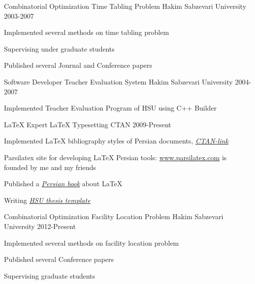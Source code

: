 \begin{cventries}
 \cventry
{Combinatorial Optimization} %
{Time Tabling Problem} %
{Hakim Sabzevari University} %
{2003-2007} %
{
	\begin{cvitems} %
		\item {Implemented several methods on time tabling problem}
		\item{Supervising under graduate students}
\item{Published several Journal and Conference papers}		
	\end{cvitems}
}

  \cventry
{Software Developer} %
{Teacher Evaluation System} %
{Hakim Sabzevari University} %
{2004-2007} %
{
	\begin{cvitems} %
		\item {Implemented Teacher Evaluation Program of HSU using C++ Builder}
	\end{cvitems}
}

  \cventry
{\LaTeX{} Expert} %
{\LaTeX{} Typesetting} %
{CTAN} %
{2009-Present} %
{
	\begin{cvitems} %
		\item {Implemented \LaTeX{} bibliography styles of Persian documents, \href{https://ctan.org/author/amintoosi?lang=en}{\textit{CTAN-link}}}
		\item{Parsilatex site for developing LaTeX Persian tools: \url{www.parsilatex.com} is founded by me and my friends}
		\item{Published a \href{http://parsilatex.com/site/product/xepersian-and-mathematical-writing-in-latex/}{\textit{Persian book}} about \LaTeX}
		\item{Writing \href{http://www.parsilatex.com/tex/samples/Sample_Thesis/HSU-Thesis/}{\textit{HSU thesis template}}}
	\end{cvitems}
}

  \cventry
{Combinatorial Optimization} %
{Facility Location Problem} %
{Hakim Sabzevari University} %
{2012-Present} %
{
	\begin{cvitems} %
		\item {Implemented several methods on facility location problem}
		\item{Published several Conference papers}
		\item{Supervising graduate students}		
	\end{cvitems}
}

\end{cventries}
